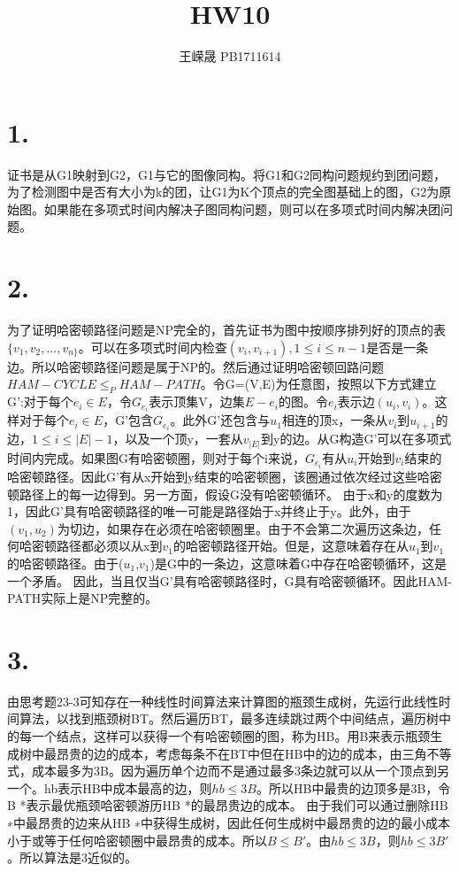 \documentclass{article}
\title{HW10}
\author{王嵘晟 \quad PB1711614}
\date{}
\begin{document}
	\maketitle
	\section*{1.}
	\par{证书是从G1映射到G2，G1与它的图像同构。将G1和G2同构问题规约到团问题，为了检测图中是否有大小为k的团，让G1为K个顶点的完全图基础上的图，G2为原始图。如果能在多项式时间内解决子图同构问题，则可以在多项式时间内解决团问题。}
	\section*{2.}
	\par{为了证明哈密顿路径问题是NP完全的，首先证书为图中按顺序排列好的顶点的表$\{v_{1},v_{2},...,v_{n\}}$。可以在多项式时间内检查$(v_{i},v_{i+1}),1\le i\le n-1$是否是一条边。所以哈密顿路径问题是属于NP的。然后通过证明哈密顿回路问题$HAM-CYCLE\le_{P}HAM-PATH$。令G=(V,E)为任意图，按照以下方式建立G':对于每个$ e_{i}\in E$，令$G_{e_{i}}$表示顶集V，边集$E-e_{i}$的图。令$e_{i}$表示边$(u_{i},v_{i})$。这样对于每个$ e_{i}\in E$，G'包含$G_{e_{i}}$。此外G'还包含与$u_{1}$相连的顶x，一条从$v_{i}$到$u_{i+1}$的边，$1\le i\le |E|-1$，以及一个顶y，一套从$v_{|E|}$到y的边。从G构造G'可以在多项式时间内完成。如果图G有哈密顿圈，则对于每个i来说，$G_{e_{i}}$有从$u_{i}$开始到$v_{i}$结束的哈密顿路径。因此G'有从x开始到y结束的哈密顿圈，该圈通过依次经过这些哈密顿路径上的每一边得到。另一方面，假设G没有哈密顿循环。 由于x和y的度数为1，因此G'具有哈密顿路径的唯一可能是路径始于x并终止于y。此外，由于$(v_{1},u_{2})$为切边，如果存在必须在哈密顿圈里。由于不会第二次遍历这条边，任何哈密顿路径都必须以从x到$v_{1}$的哈密顿路径开始。但是，这意味着存在从$u_{1}$到$v_{1}$的哈密顿路径。由于($u_{1}$,$v_{1}$)是G中的一条边，这意味着G中存在哈密顿循环，这是一个矛盾。 因此，当且仅当G'具有哈密顿路径时，G具有哈密顿循环。因此HAM-PATH实际上是NP完整的。}
	\section*{3.}
	\par{由思考题23-3可知存在一种线性时间算法来计算图的瓶颈生成树，先运行此线性时间算法，以找到瓶颈树BT。然后遍历BT，最多连续跳过两个中间结点，遍历树中的每一个结点，这样可以获得一个有哈密顿圈的图，称为HB。用B来表示瓶颈生成树中最昂贵的边的成本，考虑每条不在BT中但在HB中的边的成本，由三角不等式，成本最多为3B。因为遍历单个边而不是通过最多3条边就可以从一个顶点到另一个。hb表示HB中成本最高的边，则$hb\le 3B$。所以HB中最贵的边顶多是3B，令B *表示最优瓶颈哈密顿游历HB *的最昂贵边的成本。 由于我们可以通过删除HB ∗中最昂贵的边来从HB ∗中获得生成树，因此任何生成树中最昂贵的边的最小成本小于或等于任何哈密顿圈中最昂贵的成本。所以$B\le B'$。由$hb\le 3B$，则$hb\le 3B'$。所以算法是3近似的。}
\end{document}
